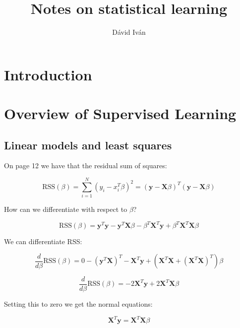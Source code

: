 \documentclass{article}
\title{Notes on statistical learning}
\author{Dávid Iván}
\begin{document}
\maketitle

\tableofcontents

\newpage
\section{Introduction}
\section{Overview of Supervised Learning}
\subsection{Linear models and least squares}

On page 12 we have that the residual sum of squares:

\begin{equation}
    \text{RSS}(\beta) = \sum_{i=1}^{N}(y_i-x_i^T\beta)^2 = (\textbf{y} - \textbf{X}\beta)^T(\textbf{y} - \textbf{X}\beta)
\end{equation}

How can we differentiate with respect to $\beta$?

\begin{equation}
    \text{RSS}(\beta) = \textbf{y}^T\textbf{y} - \textbf{y}^T\textbf{X}\beta - \beta^T \textbf{X}^T \textbf{y} + \beta^T \textbf{X}^T \textbf{X} \beta
\end{equation}

We can differentiate RSS:

\begin{equation}
    \frac{d}{d\beta} \text{RSS}(\beta) = 0 - (\textbf{y}^T \textbf{X})^T - \textbf{X}^T\textbf{y} + (\textbf{X}^T\textbf{X} + (\textbf{X}^T\textbf{X})^T)\beta
\end{equation}

\begin{equation}
    \frac{d}{d\beta} \text{RSS}(\beta) =  -2 \textbf{X}^T\textbf{y} + 2\textbf{X}^T\textbf{X}\beta
\end{equation}

Setting this to zero we get the normal equations:

\begin{equation}
    \textbf{X}^T\textbf{y} = \textbf{X}^T\textbf{X}\beta
\end{equation}
\end{document}
